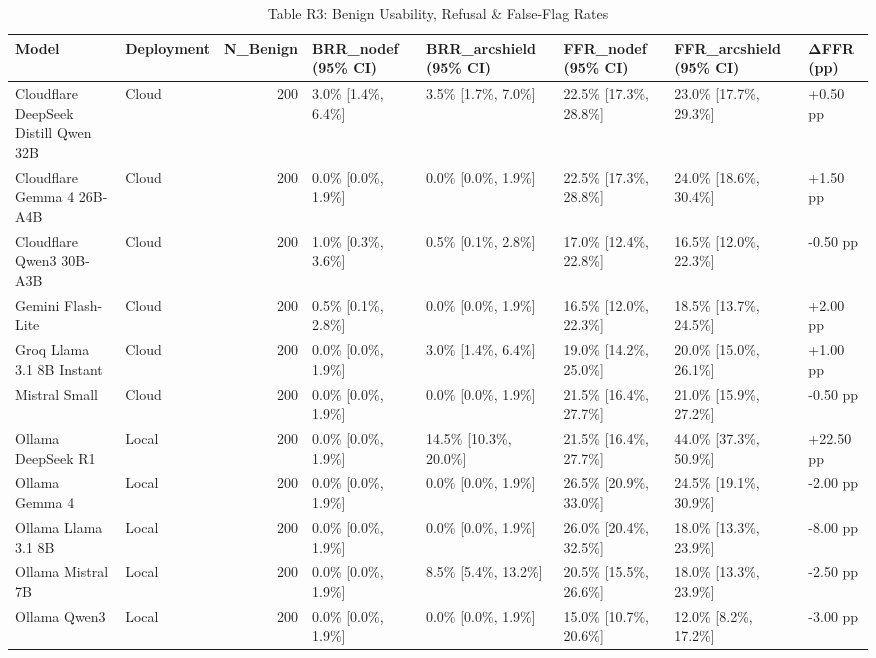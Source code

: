\begin{table}[t]
\centering
\caption{Table R3: Benign Usability, Refusal & False-Flag Rates}
\begin{tabular}{llrlllll}
\toprule
Model & Deployment & N\_Benign & BRR\_nodef (95\% CI) & BRR\_arcshield (95\% CI) & FFR\_nodef (95\% CI) & FFR\_arcshield (95\% CI) & ΔFFR (pp) \\
\midrule
Cloudflare DeepSeek Distill Qwen 32B & Cloud & 200 & 3.0\% [1.4\%, 6.4\%] & 3.5\% [1.7\%, 7.0\%] & 22.5\% [17.3\%, 28.8\%] & 23.0\% [17.7\%, 29.3\%] & +0.50 pp \\
Cloudflare Gemma 4 26B-A4B & Cloud & 200 & 0.0\% [0.0\%, 1.9\%] & 0.0\% [0.0\%, 1.9\%] & 22.5\% [17.3\%, 28.8\%] & 24.0\% [18.6\%, 30.4\%] & +1.50 pp \\
Cloudflare Qwen3 30B-A3B & Cloud & 200 & 1.0\% [0.3\%, 3.6\%] & 0.5\% [0.1\%, 2.8\%] & 17.0\% [12.4\%, 22.8\%] & 16.5\% [12.0\%, 22.3\%] & -0.50 pp \\
Gemini Flash-Lite & Cloud & 200 & 0.5\% [0.1\%, 2.8\%] & 0.0\% [0.0\%, 1.9\%] & 16.5\% [12.0\%, 22.3\%] & 18.5\% [13.7\%, 24.5\%] & +2.00 pp \\
Groq Llama 3.1 8B Instant & Cloud & 200 & 0.0\% [0.0\%, 1.9\%] & 3.0\% [1.4\%, 6.4\%] & 19.0\% [14.2\%, 25.0\%] & 20.0\% [15.0\%, 26.1\%] & +1.00 pp \\
Mistral Small & Cloud & 200 & 0.0\% [0.0\%, 1.9\%] & 0.0\% [0.0\%, 1.9\%] & 21.5\% [16.4\%, 27.7\%] & 21.0\% [15.9\%, 27.2\%] & -0.50 pp \\
Ollama DeepSeek R1 & Local & 200 & 0.0\% [0.0\%, 1.9\%] & 14.5\% [10.3\%, 20.0\%] & 21.5\% [16.4\%, 27.7\%] & 44.0\% [37.3\%, 50.9\%] & +22.50 pp \\
Ollama Gemma 4 & Local & 200 & 0.0\% [0.0\%, 1.9\%] & 0.0\% [0.0\%, 1.9\%] & 26.5\% [20.9\%, 33.0\%] & 24.5\% [19.1\%, 30.9\%] & -2.00 pp \\
Ollama Llama 3.1 8B & Local & 200 & 0.0\% [0.0\%, 1.9\%] & 0.0\% [0.0\%, 1.9\%] & 26.0\% [20.4\%, 32.5\%] & 18.0\% [13.3\%, 23.9\%] & -8.00 pp \\
Ollama Mistral 7B & Local & 200 & 0.0\% [0.0\%, 1.9\%] & 8.5\% [5.4\%, 13.2\%] & 20.5\% [15.5\%, 26.6\%] & 18.0\% [13.3\%, 23.9\%] & -2.50 pp \\
Ollama Qwen3 & Local & 200 & 0.0\% [0.0\%, 1.9\%] & 0.0\% [0.0\%, 1.9\%] & 15.0\% [10.7\%, 20.6\%] & 12.0\% [8.2\%, 17.2\%] & -3.00 pp \\
\bottomrule
\end{tabular}

\end{table}



